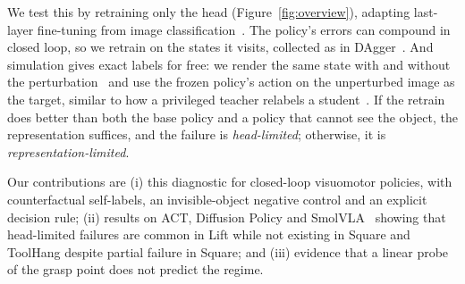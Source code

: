 \documentclass[10pt]{article}
\begin{document}
We test this by retraining only the head (Figure~\ref{fig:overview}), adapting last-layer fine-tuning
from image classification~\citep{kirichenko2023last,izmailov2022feature}. The policy's errors can
compound in closed loop, so we retrain on the states it visits, collected as in
DAgger~\citep{ross2011dagger}. And simulation gives exact labels for free: we render the same state with
and without the perturbation~\citep{james2019rcan} and use the frozen policy's action on the unperturbed
image as the target, similar to how a privileged teacher relabels a student~\citep{chen2019lbc}. If the
retrain does better than both the base policy and a policy that cannot see the object, the
representation suffices, and the failure is \emph{head-limited}; otherwise, it is
\emph{representation-limited}.

Our contributions are (i) this diagnostic for closed-loop visuomotor policies, with counterfactual
self-labels, an invisible-object negative control and an explicit decision rule; (ii) results on ACT,
Diffusion Policy and SmolVLA~\citep{shukor2025smolvla} showing that head-limited failures are common in
Lift while not existing in Square and ToolHang despite partial failure in Square; and (iii) evidence
that a linear probe of the grasp point does not predict the regime.
\end{document}
